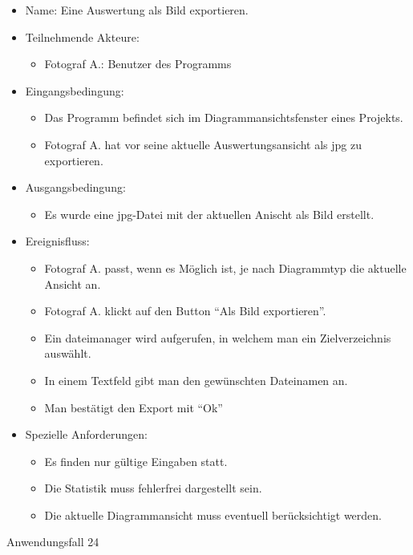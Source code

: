 \begin{itemize}
\item Name: Eine Auswertung als Bild exportieren.
\item Teilnehmende Akteure:
\begin{itemize}
\item Fotograf A.: Benutzer des Programms
\end{itemize}
\item Eingangsbedingung:
\begin{itemize}
\item Das Programm befindet sich im Diagrammansichtsfenster eines Projekts.
\item Fotograf A. hat vor seine aktuelle Auswertungsansicht als \gls{jpg} zu exportieren.
\end{itemize}
\item Ausgangsbedingung:
\begin{itemize}
\item Es wurde eine \gls{jpg}-Datei mit der aktuellen Anischt als Bild erstellt.
\end{itemize}
\item Ereignisfluss:
\begin{itemize}
\item Fotograf A. passt, wenn es Möglich ist, je nach Diagrammtyp die aktuelle Ansicht an.
\item Fotograf A. klickt auf den Button "`Als Bild exportieren"'.
\item Ein  \gls{dateimanager} wird aufgerufen, in welchem man ein Zielverzeichnis auswählt.
\item In einem Textfeld gibt man den gewünschten Dateinamen an.
\item Man bestätigt den Export mit "`Ok"' 
\end{itemize}
\item Spezielle Anforderungen:
\begin{itemize}
\item Es finden nur gültige Eingaben statt.
\item Die Statistik muss fehlerfrei dargestellt sein.
\item Die aktuelle Diagrammansicht muss eventuell berücksichtigt werden.
\end{itemize}
\end{itemize}
 
\begin{description}
\item[Anwendungsfall 24]
\end{description}
 
